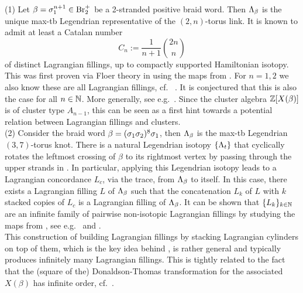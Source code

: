 \begin{example}\label{ex:Lagrangian_fillings} (1) Let $\beta=\sigma_1^{n+1}\in\mbox{Br}_2^+$ be a 2-stranded positive braid word. Then $\Lambda_\beta$ is the unique max-tb Legendrian representative of the $(2,n)$-torus link. It is known to admit at least a Catalan number $$C_n:=\frac{1}{n+1}{2n \choose n}$$
of distinct Lagrangian fillings, up to compactly supported Hamiltonian isotopy. This was first proven via Floer theory in \cite{Pan} using the maps from . For $n=1,2$ we also know these are all Lagrangian fillings, cf.~ \cite{EliashbergPolterovich96,thomson2026legendrianhopflinkexactly}. It is conjectured that this is also the case for all $n\in\mathbb{N}$. More generally, see e.g.~\cite[Conjecture 5.1]{CasalsLagSkel}. Since the cluster algebra $\mathbb{Z}[X(\beta)]$ is of cluster type $A_{n-1}$, this can be seen as a first hint towards a potential relation between Lagrangian fillings and clusters.\\

\noindent (2) Consider the braid word $\beta=(\sigma_1\sigma_2)^8\sigma_1$, then $\Lambda_\beta$ is the max-tb Legendrian $(3,7)$-torus knot. There is a natural Legendrian isotopy $\{\Lambda_t\}$ that cyclically rotates the leftmost crossing of $\beta$ to its rightmost vertex by passing through the upper strands in . In particular, applying this Legendrian isotopy leads to a Lagrangian concordance $L_{c}$, via the trace, from $\Lambda_\beta$ to itself. In this case, there exists a Lagrangian filling $L$ of $\Lambda_\beta$ such that the concatenation $L_k$ of $L$ with $k$ stacked copies of $L_c$ is a Lagrangian filling of $\Lambda_\beta$. It can be shown that $\{L_k\}_{k\in\mathbb{N}}$ are an infinite family of pairwise non-isotopic Lagrangian fillings by studying the maps from , see e.g.~\cite{CasalsNg22} and \cite{Casals_NewtonPolytopes}.\\

\noindent This construction of building Lagrangian fillings by stacking Lagrangian cylinders on top of them, which is the key idea behind \cite{CasalsGao22}, is rather general and typically produces infinitely many Lagrangian fillings. This is tightly related to the fact that the (square of the) Donaldson-Thomas transformation for the associated $X(\beta)$ has infinite order, cf.~\cite{GSW2024}.\\


\end{example}
